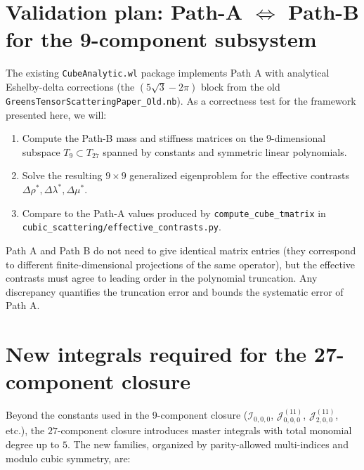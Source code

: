 \documentclass[11pt,a4paper]{article}
\theoremstyle{plain}
\theoremstyle{definition}
\theoremstyle{remark}
\begin{document}


\section{Validation plan: Path-A $\Leftrightarrow$ Path-B for the 9-component subsystem}

The existing \texttt{CubeAnalytic.wl} package implements Path A with
analytical Eshelby-delta corrections (the $(5\sqrt{3} - 2\pi)$ block from
the old \texttt{GreensTensorScatteringPaper\_Old.nb}).  As a correctness
test for the framework presented here, we will:
\begin{enumerate}[label=(V\arabic*)]
\item Compute the Path-B mass and stiffness matrices on the 9-dimensional
      subspace $T_9 \subset T_{27}$ spanned by constants and symmetric
      linear polynomials.
\item Solve the resulting $9\times 9$ generalized eigenproblem for the
      effective contrasts $\Delta\rho^{*}, \Delta\lambda^{*}, \Delta\mu^{*}$.
\item {\sloppy Compare to the Path-A values produced by
      \texttt{compute\_\allowbreak cube\_\allowbreak tmatrix} in
      \texttt{cubic\_\allowbreak scattering/\allowbreak effective\_\allowbreak contrasts.py}.\par}
\end{enumerate}
Path A and Path B do not need to give identical matrix entries (they
correspond to different finite-dimensional projections of the same
operator), but the effective contrasts must agree to leading order in
the polynomial truncation.  Any discrepancy quantifies the truncation
error and bounds the systematic error of Path A.

\section{New integrals required for the 27-component closure}

Beyond the constants used in the 9-component closure
($\mathcal{I}_{0,0,0}$, $\mathcal{J}^{(11)}_{0,0,0}$,
$\mathcal{J}^{(11)}_{2,0,0}$, etc.), the $27$-component closure
introduces master integrals with total monomial degree up to $5$.
The new families, organized by parity-allowed multi-indices and modulo
cubic symmetry, are:
\end{document}
